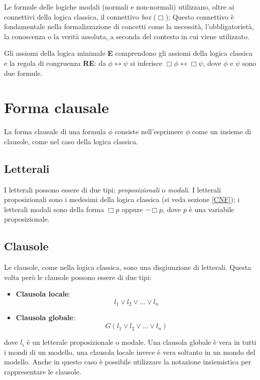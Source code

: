 \documentclass[a4paper,12pt]{report}
\newcommand{\tto} {\leftrightarrow}
\begin{document}
Le formule delle logiche modali (normali e non-normali) utilizzano, oltre ai connettivi della logica classica, il connettivo \emph{box} ($\Box$); Questo connettivo è fondamentale nella formalizzazione di concetti come la necessità, l'obbligatorietà, la conoscenza o la verità assoluta, a seconda del contesto in cui viene utilizzato.

Gli assiomi della logica minimale \textbf{E} comprendono gli assiomi della logica classica e la regola di congruenza \textbf{RE}: da $\phi \tto \psi$ si inferisce $\Box \phi \tto \Box \psi$, dove $\phi$ e $\psi$ sono due formule.

\section{Forma clausale}
La forma clausale di una formula $\phi$ consiste nell'esprimere $\phi$ come un insieme di clausole, come nel caso della logica classica.
\subsection*{Letterali}
I letterali possono essere di due tipi: \emph{proposizionali} o \emph{modali}. I letterali proposizionali sono i medesimi della logica classica (si veda sezione \ref{CNF}); i letterali modali sono della forma $\Box p$ oppure $\lnot \Box p$, dove $p$ è una variabile proposizionale.
\subsection*{Clausole}
Le clausole, come nella logica classica, sono una disgiunzione di letterali. Questa volta però le clausole possono essere di due tipi: 
\begin{itemize}
    \item \textbf{Clausola locale}: \[ l_1 \lor l_2 \lor \ldots \lor l_n \]
    \item \textbf{Clausola globale}: \[ G(l_1 \lor l_2 \lor \ldots \lor l_n) \]
\end{itemize}
dove $l_i$ è un letterale proposizionale o modale. Una clausola globale è vera in tutti i mondi di un modello, una clausola locale invece è vera soltanto in un mondo del modello. Anche in questo caso è possibile utilizzare la notazione insiemistica per rappresentare le clausole.
\end{document}
